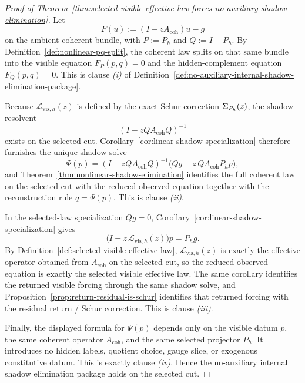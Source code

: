 \begin{proof}[Proof of Theorem~\ref{thm:selected-visible-effective-law-forces-no-auxiliary-shadow-elimination}]
\label{proof:thm:selected-visible-effective-law-forces-no-auxiliary-shadow-elimination}
Let
\[
F(u):=(I-zA_{\mathrm{coh}})u-g
\]
on the ambient coherent bundle, with \(P:=P_h\) and \(Q:=I-P_h\). By
Definition~\ref{def:nonlinear-pq-split}, the coherent law splits on that same
bundle into the visible equation \(F_P(p,q)=0\) and the hidden-complement
equation \(F_Q(p,q)=0\). This is clause \emph{(i)} of
Definition~\ref{def:no-auxiliary-internal-shadow-elimination-package}.

Because \(\mathcal L_{\mathrm{vis},h}(z)\) is defined by the exact Schur
correction \(\Sigma_{P_h}(z)\), the shadow resolvent
\[
(I-zQA_{\mathrm{coh}}Q)^{-1}
\]
exists on the selected cut. Corollary~\ref{cor:linear-shadow-specialization}
therefore furnishes the unique shadow solve
\[
\Psi(p)
=
(I-zQA_{\mathrm{coh}}Q)^{-1}\bigl(Qg+z\,QA_{\mathrm{coh}}P_hp\bigr),
\]
and Theorem~\ref{thm:nonlinear-shadow-elimination} identifies the full
coherent law on the selected cut with the reduced observed equation together
with the reconstruction rule \(q=\Psi(p)\). This is clause \emph{(ii)}.

In the selected-law specialization \(Qg=0\),
Corollary~\ref{cor:linear-shadow-specialization} gives
\[
\bigl(I-z\,\mathcal L_{\mathrm{vis},h}(z)\bigr)p=P_hg.
\]
By Definition~\ref{def:selected-visible-effective-law},
\(\mathcal L_{\mathrm{vis},h}(z)\) is exactly the effective operator obtained
from \(A_{\mathrm{coh}}\) on the selected cut, so the reduced observed
equation is exactly the selected visible effective law.
The same corollary identifies the returned visible forcing through the same
shadow solve, and Proposition~\ref{prop:return-residual-is-schur} identifies
that returned forcing with the residual return / Schur correction. This is
clause \emph{(iii)}.

Finally, the displayed formula for \(\Psi(p)\) depends only on the visible
datum \(p\), the same coherent operator \(A_{\mathrm{coh}}\), and the same
selected projector \(P_h\). It introduces no hidden labels, quotient choice,
gauge slice, or exogenous constitutive datum. This is exactly clause
\emph{(iv)}. Hence the no-auxiliary internal shadow elimination package holds
on the selected cut.
\end{proof}

